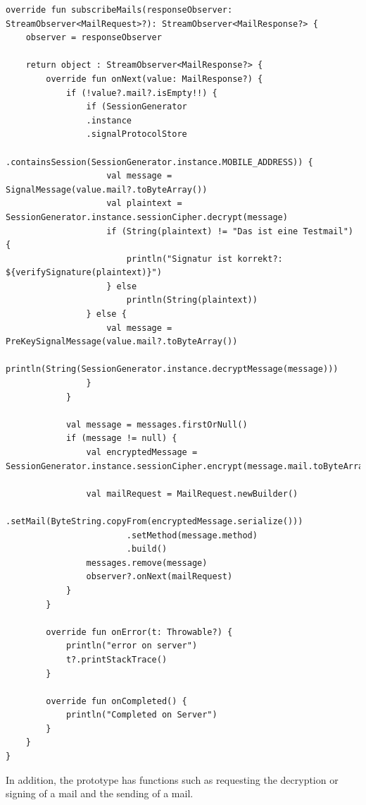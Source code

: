 \documentclass[12pt,oneside,a4paper,parskip]{scrbook}
\begin{document}
\begin{lstlisting}
override fun subscribeMails(responseObserver: StreamObserver<MailRequest>?): StreamObserver<MailResponse?> {
    observer = responseObserver
    
    return object : StreamObserver<MailResponse?> {
        override fun onNext(value: MailResponse?) {
            if (!value?.mail?.isEmpty!!) {
                if (SessionGenerator
                .instance
                .signalProtocolStore
                .containsSession(SessionGenerator.instance.MOBILE_ADDRESS)) {
                    val message = SignalMessage(value.mail?.toByteArray())
                    val plaintext = SessionGenerator.instance.sessionCipher.decrypt(message)
                    if (String(plaintext) != "Das ist eine Testmail") {
                        println("Signatur ist korrekt?: ${verifySignature(plaintext)}")
                    } else
                        println(String(plaintext))
                } else {
                    val message = PreKeySignalMessage(value.mail?.toByteArray())
                    println(String(SessionGenerator.instance.decryptMessage(message)))
                }
            }
    
            val message = messages.firstOrNull()
            if (message != null) {
                val encryptedMessage = SessionGenerator.instance.sessionCipher.encrypt(message.mail.toByteArray())
    
                val mailRequest = MailRequest.newBuilder()
                        .setMail(ByteString.copyFrom(encryptedMessage.serialize()))
                        .setMethod(message.method)
                        .build()
                messages.remove(message)
                observer?.onNext(mailRequest)
            }
        }
    
        override fun onError(t: Throwable?) {
            println("error on server")
            t?.printStackTrace()
        }
    
        override fun onCompleted() {
            println("Completed on Server")
        }
    }
}
\end{lstlisting}

In addition, the prototype has functions such as requesting the decryption or signing of a mail and the sending of a mail.


\end{document}
